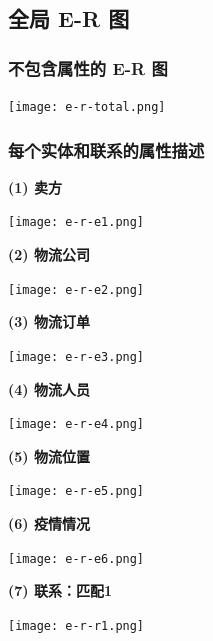 \documentclass[12pt]{article}
\begin{document}
\subsection{全局 E-R 图 }

\subsubsection{不包含属性的 E-R 图}

\begin{center}
	\texttt{[image: e-r-total.png]}
\end{center}

\subsubsection{每个实体和联系的属性描述}

\noindent \textbf{(1) 卖方}

\begin{center}
	\texttt{[image: e-r-e1.png]}
\end{center}

\noindent \textbf{(2) 物流公司}

\begin{center}
	\texttt{[image: e-r-e2.png]}
\end{center}

\noindent \textbf{(3) 物流订单}

\begin{center}
	\texttt{[image: e-r-e3.png]}
\end{center}

\noindent \textbf{(4) 物流人员}

\begin{center}
	\texttt{[image: e-r-e4.png]}
\end{center}


\noindent \textbf{(5) 物流位置}

\begin{center}
	\texttt{[image: e-r-e5.png]}
\end{center}

\newpage
\noindent \textbf{(6) 疫情情况}

\begin{center}
	\texttt{[image: e-r-e6.png]}
\end{center}

\noindent \textbf{(7) 联系：匹配1}

\begin{center}
	\texttt{[image: e-r-r1.png]}
\end{center}
\end{document}

